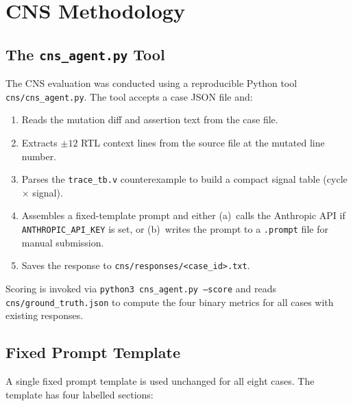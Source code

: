 \documentclass[11pt,a4paper]{article}
\begin{document}
\section{CNS Methodology}

\subsection{The \texttt{cns\_agent.py} Tool}

The CNS evaluation was conducted using a reproducible Python tool
\texttt{cns/cns\_agent.py}. The tool accepts a case JSON file and:

\begin{enumerate}
  \item Reads the mutation diff and assertion text from the case file.
  \item Extracts $\pm 12$ RTL context lines from the source file at the mutated
    line number.
  \item Parses the \texttt{trace\_tb.v} counterexample to build a compact
    signal table (cycle $\times$ signal).
  \item Assembles a fixed-template prompt and either (a)~calls the Anthropic
    API if \texttt{ANTHROPIC\_API\_KEY} is set, or (b)~writes the prompt to a
    \texttt{.prompt} file for manual submission.
  \item Saves the response to \texttt{cns/responses/<case\_id>.txt}.
\end{enumerate}

Scoring is invoked via \texttt{python3 cns\_agent.py --score} and reads
\texttt{cns/ground\_truth.json} to compute the four binary metrics for all
cases with existing responses.

\subsection{Fixed Prompt Template}

A single fixed prompt template is used unchanged for all eight cases. The
template has four labelled sections:
\end{document}
